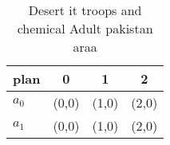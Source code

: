 \documentclass[a4paper]{article}
\begin{document}
\begin{table}
\begin{adjustbox}{width=0.6\columnwidth}
\begin{tabular}{|l|l|l|l|}
\hline
\textbf{plan} & \multicolumn{1}{c|}{\textbf{0}} & \multicolumn{1}{c|}{\textbf{1}} & \multicolumn{1}{c|}{\textbf{2}} \\ \hline
\textbf{$a_0$}  & (0,0) & (1,0) & (2,0) \\ \hline
\textbf{$a_1$}  & (0,0) & (1,0) & (2,0) \\ \hline
\end{tabular}
\end{adjustbox}
\caption{Desert it troops and chemical Adult pakistan araa
}
\end{table}
\end{document}
